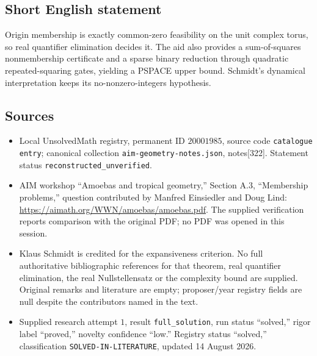 \documentclass[11pt]{article}
\begin{document}
\subsection{Short English statement}
Origin membership is exactly common-zero feasibility on the unit complex torus, so real quantifier elimination decides it. The aid also provides a sum-of-squares nonmembership certificate and a sparse binary reduction through quadratic repeated-squaring gates, yielding a PSPACE upper bound. Schmidt's dynamical interpretation keeps its no-nonzero-integers hypothesis.
\subsection{Sources}
\begin{itemize}
\item Local UnsolvedMath registry, permanent ID \(20001985\), source code \texttt{catalogue entry}; canonical collection \texttt{aim-geometry-notes.json}, notes[322]. Statement status \texttt{reconstructed\_unverified}.
\item AIM workshop ``Amoebas and tropical geometry,'' Section A.3, ``Membership problems,'' question contributed by Manfred Einsiedler and Doug Lind: \url{https://aimath.org/WWN/amoebas/amoebas.pdf}. The supplied verification reports comparison with the original PDF; no PDF was opened in this session.
\item Klaus Schmidt is credited for the expansiveness criterion. No full authoritative bibliographic references for that theorem, real quantifier elimination, the real Nullstellensatz or the complexity bound are supplied. Original remarks and literature are empty; proposer/year registry fields are null despite the contributors named in the text.
\item Supplied research attempt \(1\), result \texttt{full\_solution}, run status ``solved,'' rigor label ``proved,'' novelty confidence ``low.'' Registry status ``solved,'' classification \texttt{SOLVED-IN-LITERATURE}, updated 14 August 2026.
\end{itemize}
\end{document}
